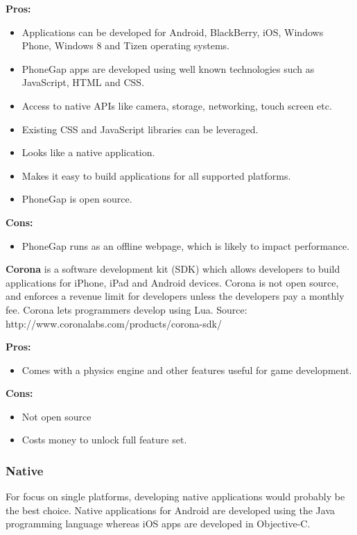 \indent
  {\bf Pros:}
  \begin{itemize}
    \item Applications can be developed for Android, BlackBerry, iOS,
          Windows Phone, Windows 8 and Tizen operating systems.
    \item PhoneGap apps are developed using well known technologies such as
          JavaScript, HTML and CSS.
    \item Access to native APIs like camera, storage, networking,
          touch screen etc.
    \item Existing CSS and JavaScript libraries can be leveraged.
    \item Looks like a native application.
    \item Makes it easy to build applications for all supported platforms.
    \item PhoneGap is open source.
  \end{itemize}

\indent
{\bf Cons:}
  \begin{itemize}
    \item PhoneGap runs as an offline webpage, which is likely to impact
          performance.
  \end{itemize}

\noindent
{\bf Corona} is a software development kit (SDK) which allows developers to
build applications for iPhone, iPad and Android devices. Corona is not open
source, and enforces a revenue limit for developers unless the developers pay a
monthly fee. Corona lets programmers develop using Lua.
Source: http://www.coronalabs.com/products/corona-sdk/

\indent
  {\bf Pros:}
  \begin{itemize}
    \item Comes with a physics engine and other features useful for game
          development.
  \end{itemize}

\indent
  {\bf Cons:}
  \begin{itemize}
    \item Not open source
    \item Costs money to unlock full feature set.
  \end{itemize}

\subsubsection{Native}
For focus on single platforms, developing native applications would probably be
the best choice. Native applications for Android are developed using the Java
programming language whereas iOS apps are developed in Objective-C.

